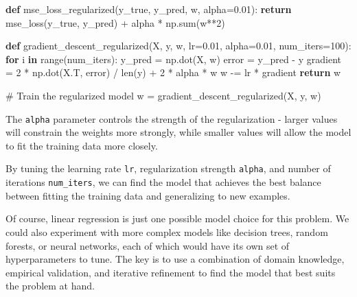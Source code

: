 \documentclass[
  9pt,
  letterpaper,
  abstract,
  titlepage]{scrbook}
\newenvironment{Shaded}{\begin{snugshade}}{\end{snugshade}}
\newcommand{\BuiltInTok}[1]{\textcolor[rgb]{0.00,0.23,0.31}{#1}}
\newcommand{\CommentTok}[1]{\textcolor[rgb]{0.37,0.37,0.37}{#1}}
\newcommand{\ControlFlowTok}[1]{\textcolor[rgb]{0.00,0.23,0.31}{\textbf{#1}}}
\newcommand{\DecValTok}[1]{\textcolor[rgb]{0.68,0.00,0.00}{#1}}
\newcommand{\FloatTok}[1]{\textcolor[rgb]{0.68,0.00,0.00}{#1}}
\newcommand{\KeywordTok}[1]{\textcolor[rgb]{0.00,0.23,0.31}{\textbf{#1}}}
\newcommand{\NormalTok}[1]{\textcolor[rgb]{0.00,0.23,0.31}{#1}}
\newcommand{\OperatorTok}[1]{\textcolor[rgb]{0.37,0.37,0.37}{#1}}
\begin{document}
\begin{Shaded}
\begin{Highlighting}[]
\KeywordTok{def}\NormalTok{ mse\_loss\_regularized(y\_true, y\_pred, w, alpha}\OperatorTok{=}\FloatTok{0.01}\NormalTok{):}
    \ControlFlowTok{return}\NormalTok{ mse\_loss(y\_true, y\_pred) }\OperatorTok{+}\NormalTok{ alpha }\OperatorTok{*}\NormalTok{ np.}\BuiltInTok{sum}\NormalTok{(w}\OperatorTok{**}\DecValTok{2}\NormalTok{)}

\KeywordTok{def}\NormalTok{ gradient\_descent\_regularized(X, y, w, lr}\OperatorTok{=}\FloatTok{0.01}\NormalTok{, alpha}\OperatorTok{=}\FloatTok{0.01}\NormalTok{, num\_iters}\OperatorTok{=}\DecValTok{100}\NormalTok{):}
    \ControlFlowTok{for}\NormalTok{ i }\KeywordTok{in} \BuiltInTok{range}\NormalTok{(num\_iters):}
\NormalTok{        y\_pred }\OperatorTok{=}\NormalTok{ np.dot(X, w)}
\NormalTok{        error }\OperatorTok{=}\NormalTok{ y\_pred }\OperatorTok{{-}}\NormalTok{ y}
\NormalTok{        gradient }\OperatorTok{=} \DecValTok{2} \OperatorTok{*}\NormalTok{ np.dot(X.T, error) }\OperatorTok{/} \BuiltInTok{len}\NormalTok{(y) }\OperatorTok{+} \DecValTok{2} \OperatorTok{*}\NormalTok{ alpha }\OperatorTok{*}\NormalTok{ w}
\NormalTok{        w }\OperatorTok{{-}=}\NormalTok{ lr }\OperatorTok{*}\NormalTok{ gradient}
    \ControlFlowTok{return}\NormalTok{ w}

\CommentTok{\# Train the regularized model}
\NormalTok{w }\OperatorTok{=}\NormalTok{ gradient\_descent\_regularized(X, y, w)}
\end{Highlighting}
\end{Shaded}

The \texttt{alpha} parameter controls the strength of the regularization
- larger values will constrain the weights more strongly, while smaller
values will allow the model to fit the training data more closely.

By tuning the learning rate \texttt{lr}, regularization strength
\texttt{alpha}, and number of iterations \texttt{num\_iters}, we can
find the model that achieves the best balance between fitting the
training data and generalizing to new examples.

Of course, linear regression is just one possible model choice for this
problem. We could also experiment with more complex models like decision
trees, random forests, or neural networks, each of which would have its
own set of hyperparameters to tune. The key is to use a combination of
domain knowledge, empirical validation, and iterative refinement to find
the model that best suits the problem at hand.
\end{document}
